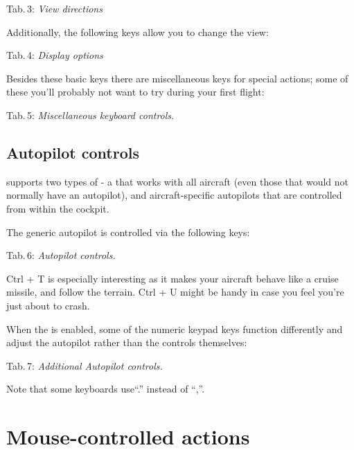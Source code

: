 \centerline{}
Tab.\,3: \textit{View directions}
\medskip

Additionally, the following keys allow you to change the view:
\medskip

\noindent
\centerline{}
Tab.\,4: \textit{Display options}
\medskip

Besides these basic keys there are miscellaneous keys for special
actions; some of these you'll probably not want to try during your
first flight:

\medskip
\centerline{}
\noindent Tab.\,5: \textit{Miscellaneous keyboard controls.}
\medskip

\subsection{Autopilot controls}

\FlightGear{} supports two types of  - a 
that works with all aircraft (even those that would not normally have an autopilot),
and aircraft-specific autopilots that are controlled from within the cockpit.

The generic autopilot is controlled via the following keys:

\medskip

\centerline{}
\noindent
 Tab.\,6: \textit{Autopilot controls.}
\medskip

\noindent Ctrl + T is especially interesting as it makes your aircraft behave
like a cruise missile, and follow the terrain. Ctrl + U might be handy in case
you feel you're just about to crash.

When the  is enabled, some of the numeric keypad keys function
differently and adjust the autopilot rather than the controls themselves:

\medskip
\centerline{}
\noindent
 Tab.\,7: \textit{Additional Autopilot controls.}
\medskip

Note that some keyboards use``.'' instead of ``,''.

\section{Mouse-controlled actions}

